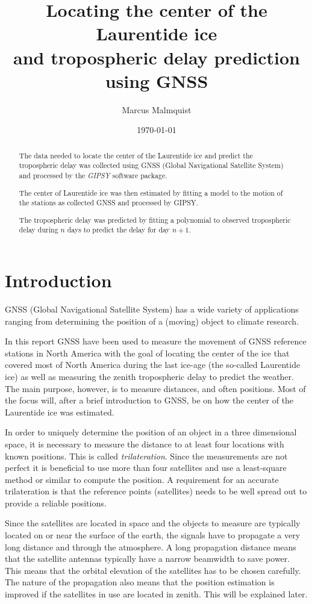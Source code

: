 \documentclass[12pt,a4paper]{article}
\title{Locating the center of the Laurentide ice\\and tropospheric delay prediction\\using GNSS}
\author{Marcus Malmquist}
\date{\today}
\begin{document}
\maketitle
\begin{abstract}
  \noindent The data needed to locate the center of the Laurentide ice and predict the tropospheric delay was collected using GNSS (Global Navigational Satellite System) and processed by the \textit{GIPSY} software package.
  
  The center of Laurentide ice was then estimated by fitting a model to the motion of the stations as collected GNSS and processed by GIPSY.
  
  The tropospheric delay was predicted by fitting a polynomial to observed tropospheric delay during $n$ days to predict the delay for day $n+1$.
\end{abstract}
\newpage
{}
\tableofcontents
\newpage
{}
\section{Introduction}
GNSS (Global Navigational Satellite System) has a wide variety of applications ranging from determining the position of a (moving) object to climate research.

In this report GNSS have been used to measure the movement of GNSS reference stations in North America with the goal of locating the center of the ice that covered most of North America during the last ice-age (the so-called Laurentide ice) as well as measuring the zenith tropospheric delay to predict the weather.
The main purpose, however, is to measure distances, and often positions.
Most of the focus will, after a brief introduction to GNSS, be on how the center of the Laurentide ice was estimated.

In order to uniquely determine the position of an object in a three dimensional space, it is necessary to measure the distance to at least four locations with known positions.
This is called \textit{trilateration}.
Since the measurements are not perfect it is beneficial to use more than four satellites and use a least-square method or similar to compute the position.
A requirement for an accurate trilateration is that the reference points (satellites) needs to be well spread out to provide a reliable positions.

Since the satellites are located in space and the objects to measure are typically located on or near the surface of the earth, the signals have to propagate a very long distance and through the atmosphere.
A long propagation distance means that the satellite antennas typically have a narrow beamwidth to save power.
This means that the orbital elevation of the satellites has to be chosen carefully.
The nature of the propagation also means that the position estimation is improved if the satellites in use are located in zenith.
This will be explained later.\\
\end{document}
